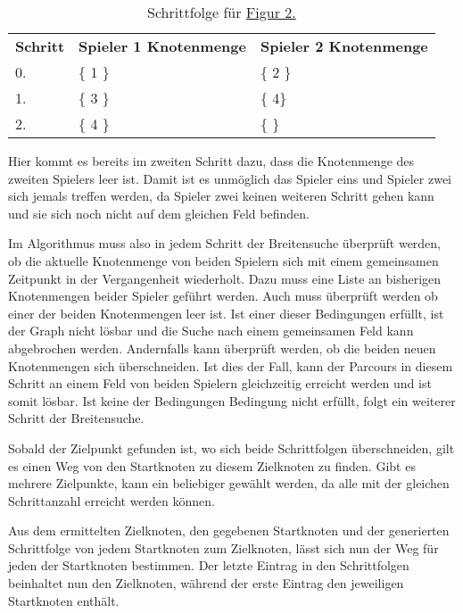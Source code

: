 \documentclass[a4paper,10pt,ngerman]{scrartcl}
\begin{document}
    \begin{table}[!h]
        \centering
        \begin{tabular}{lll}
            \textbf{Schritt} & \textbf{Spieler 1 Knotenmenge} & \textbf{Spieler 2 Knotenmenge} \\
            0.               & \{ 1 \}                        & \{ 2 \}                        \\
            1.               & \{ 3 \}                        & \{  4\}                          \\
            2.               & \{ 4 \}                        & \{  \}                           \\
        \end{tabular}
        \caption{Schrittfolge für \hyperref[fig:Figure2]{Figur 2.}}
        \label{tab:Table2}
    \end{table}

    Hier kommt es bereits im zweiten Schritt dazu, dass die Knotenmenge des zweiten Spielers leer ist.
    Damit ist es unmöglich das Spieler eins und Spieler zwei sich jemals treffen werden,
    da Spieler zwei keinen weiteren Schritt gehen kann und sie sich noch nicht auf dem gleichen Feld befinden.

    Im Algorithmus muss also in jedem Schritt der Breitensuche überprüft werden,
    ob die aktuelle Knotenmenge von beiden Spielern sich
    mit einem gemeinsamen Zeitpunkt in der Vergangenheit wiederholt.
    Dazu muss eine Liste an bisherigen Knotenmengen beider Spieler geführt werden.
    Auch muss überprüft werden ob einer der beiden Knotenmengen leer ist.
    Ist einer dieser Bedingungen erfüllt, ist der Graph nicht lösbar
    und die Suche nach einem gemeinsamen Feld kann abgebrochen werden.
    Andernfalls kann überprüft werden,
    ob die beiden neuen Knotenmengen sich überschneiden.
    Ist dies der Fall, kann der Parcours in diesem Schritt an einem Feld
    von beiden Spielern gleichzeitig erreicht werden und ist somit lösbar.
    Ist keine der Bedingungen Bedingung nicht erfüllt,
    folgt ein weiterer Schritt der Breitensuche.

    Sobald der Zielpunkt gefunden ist,
    wo sich beide Schrittfolgen überschneiden,
    gilt es einen Weg von den Startknoten zu diesem Zielknoten zu finden.
    Gibt es mehrere Zielpunkte, kann ein beliebiger gewählt werden,
    da alle mit der gleichen Schrittanzahl erreicht werden können.

    Aus dem ermittelten Zielknoten, den gegebenen Startknoten und
    der generierten Schrittfolge von jedem Startknoten zum Zielknoten,
    lässt sich nun der Weg für jeden der Startknoten bestimmen.
    Der letzte Eintrag in den Schrittfolgen beinhaltet nun den Zielknoten,
    während der erste Eintrag den jeweiligen Startknoten enthält.
\end{document}
